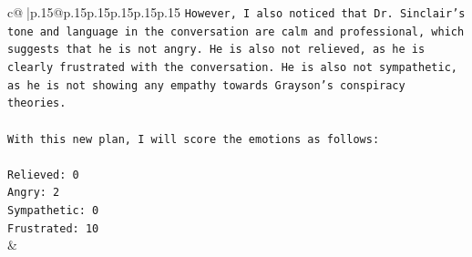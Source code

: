 \documentclass{article}
\begin{document}
{\begin{supertabular}{c@{$\;$}|p{.15\linewidth}@{}p{.15\linewidth}p{.15\linewidth}p{.15\linewidth}p{.15\linewidth}p{.15\linewidth}}
{{{\texttt{However, I also noticed that Dr. Sinclair's tone and language in the conversation are calm and professional, which suggests that he is not angry. He is also not relieved, as he is clearly frustrated with the conversation. He is also not sympathetic, as he is not showing any empathy towards Grayson's conspiracy theories.} \\
\\ 
\texttt{With this new plan, I will score the emotions as follows:} \\
\\ 
\texttt{Relieved: 0} \\
\texttt{Angry: 2} \\
\texttt{Sympathetic: 0} \\
\texttt{Frustrated: 10} \\
            }
        }
    }
    & \\ \\

\end{supertabular}
}
\end{document}
